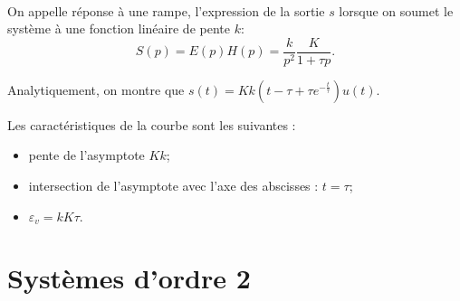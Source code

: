 \documentclass[10pt,fleqn]{article} %
\begin{document}
\begin{resultat}~\\

\noindent \begin{minipage}[c]{.65\linewidth}
On appelle réponse à une rampe, l'expression de la sortie $s$ lorsque on soumet le système à une fonction linéaire de pente $k$: 
$$
S(p)=E(p)H(p) = \dfrac{k}{p^2} \dfrac{K}{1+\tau p}.
$$ 


Analytiquement, on montre que $s(t)=Kk \left(t-\tau+\tau e^{-\frac{t}{\tau}}\right)u(t)$. 

Les caractéristiques de la courbe sont les suivantes : 
\begin{itemize}
\item pente de l'asymptote $K k$;
\item intersection de l'asymptote avec l'axe des abscisses : $t=\tau$;
\item $\varepsilon_{v}=kK\tau$.
\end{itemize}


\end{minipage} \hfill
\begin{minipage}[c]{.32\linewidth}
\centering

\end{minipage}
\end{resultat}



\section{Systèmes d'ordre 2}
\end{document}
